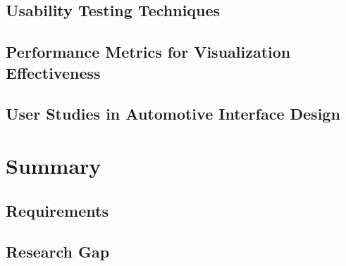 \subsection{Usability Testing Techniques}
\subsection{Performance Metrics for Visualization Effectiveness}
\subsection{User Studies in Automotive Interface Design}

\section{Summary}
\subsection{Requirements}
\subsection{Research Gap}


